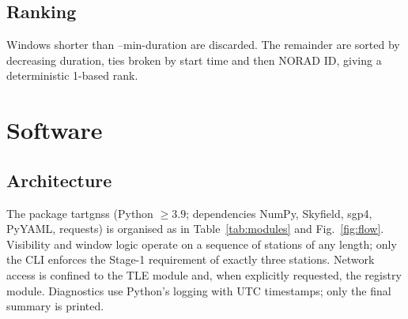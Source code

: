 \documentclass[11pt,a4paper]{article}
\newcommand{\code}[1]{{\ttfamily\def\_{\textunderscore\allowbreak}#1}}
\begin{document}
\subsection{Ranking}

Windows shorter than \code{--min-duration} are discarded. The remainder are
sorted by decreasing duration, ties broken by start time and then NORAD ID,
giving a deterministic 1-based rank.

\section{Software}

\subsection{Architecture}

The package \code{tart\_gnss} (Python $\ge 3.9$; dependencies NumPy,
Skyfield, sgp4, PyYAML, requests) is organised as in Table~\ref{tab:modules} and
Fig.~\ref{fig:flow}. Visibility and window logic operate on a sequence of
stations of any length; only the CLI enforces the Stage-1 requirement of
exactly three stations. Network access is confined to the TLE module and,
when explicitly requested, the registry module.
Diagnostics use Python's \code{logging} with UTC timestamps; only the final
summary is printed.
\end{document}
